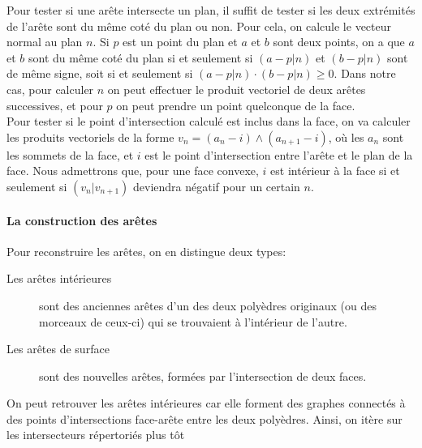 \documentclass[a4paper]{article}
\begin{document}
         Pour tester si une arête intersecte un plan, il suffit de tester si les deux extrémités de l'arête sont du même coté du plan ou non. Pour cela, on calcule le vecteur normal au plan $n$. Si $p$ est un point du plan et $a$ et $b$ sont deux points, on a que $a$ et $b$ sont du même coté du plan si et seulement si $(a - p | n)$ et $(b - p | n)$ sont de même signe, soit si et seulement si $(a - p | n) \cdot (b - p | n) \geqslant 0$. Dans notre cas, pour calculer $n$ on peut effectuer le produit vectoriel de deux arêtes successives, et pour $p$ on peut prendre un point quelconque de la face.\\
         Pour tester si le point d'intersection calculé est inclus dans la face, on va calculer les produits vectoriels de la forme $v_n = (a_n - i) \wedge (a_{n+1} - i)$, où les $a_n$ sont les sommets de la face, et $i$ est le point d'intersection entre l'arête et le plan de la face. Nous admettrons que, pour une face convexe, $i$ est intérieur à la face si et seulement si $(v_n | v_{n+1})$ deviendra négatif pour un certain $n$.

      \paragraph{La construction des arêtes}

        Pour reconstruire les arêtes, on en distingue deux types:
        \begin{description}
          \item[Les arêtes intérieures] sont des anciennes arêtes d'un des deux polyèdres originaux (ou des morceaux de ceux-ci) qui se trouvaient à l'intérieur de l'autre. 
          \item[Les arêtes de surface] sont des nouvelles arêtes, formées par l'intersection de deux faces.
        \end{description}

        On peut retrouver les arêtes intérieures car elle forment des graphes connectés à des points d'intersections face-arête entre les deux polyèdres. Ainsi, on itère sur les intersecteurs répertoriés plus tôt
\end{document}
